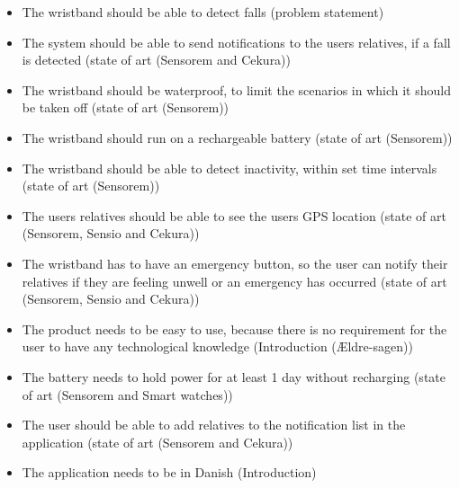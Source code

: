 \begin{itemize}
    \item The wristband should be able to detect falls (problem statement)
    \item The system should be able to send notifications to the users relatives, if a fall is detected (state of art (Sensorem and Cekura)) 
    \item The wristband should be waterproof, to limit the scenarios in which it should be taken off  (state of art (Sensorem))
    \item The wristband should run on a rechargeable battery (state of art (Sensorem))
    \item The wristband should be able to detect inactivity, within set time intervals (state of art (Sensorem))
    \item The users relatives should be able to see the users GPS location (state of art (Sensorem, Sensio and Cekura))
    \item  The wristband has to have an emergency button, so the user can notify their relatives if they are feeling unwell or an emergency has occurred (state of art (Sensorem, Sensio and Cekura))
    \item The product needs to be easy to use, because there is no requirement for the user to have any technological knowledge (Introduction (Ældre-sagen))
    \item The battery needs to hold power for at least 1 day without recharging (state of art (Sensorem and Smart watches))
    \item The user should be able to add relatives to the notification list in the application (state of art (Sensorem and Cekura))
    \item The application needs to be in Danish (Introduction)
\end{itemize}